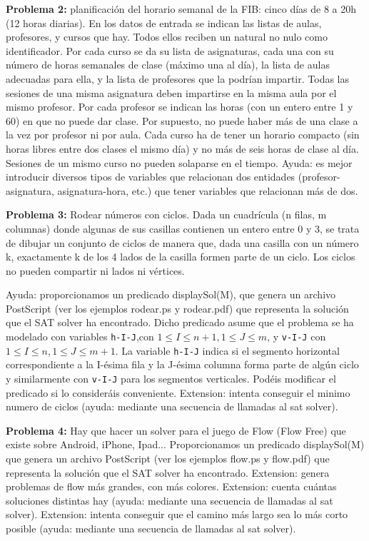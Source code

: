 \documentclass[11pt]{article}
\begin{document}
\textbf{Problema 2:} planificación del horario semanal de la FIB: cinco días de 8 a 20h (12 horas diarias).
En los datos de entrada se indican las listas de aulas, profesores, y cursos que hay. Todos ellos
reciben un natural no nulo como identificador. Por cada curso se da su lista de asignaturas, cada
una con su número de horas semanales de clase (máximo una al día), la lista de aulas adecuadas para
ella, y la lista de profesores que la podrían impartir. Todas las sesiones de una misma asignatura
deben impartirse en la misma aula por el mismo profesor. Por cada profesor se indican las horas
(con un entero entre 1 y 60) en que no puede dar clase. Por supuesto, no puede haber más de una
clase a la vez por profesor ni por aula. Cada curso ha de tener un horario compacto (sin horas
libres entre dos clases el mismo día) y no más de seis horas de clase al día. Sesiones de un mismo
curso no pueden solaparse en el tiempo. Ayuda: es mejor introducir diversos tipos de variables que relacionan
dos entidades (profesor-asignatura, asignatura-hora, etc.) que tener variables que relacionan más de dos.
\medskip

\textbf{Problema 3:} Rodear números con ciclos. Dada un cuadrícula (n filas, m columnas) donde algunas
de sus casillas contienen un entero entre 0 y 3, se trata de dibujar un conjunto de ciclos de manera
que, dada una casilla con un número k, exactamente k de los 4 lados de la casilla formen parte de
un ciclo. Los ciclos no pueden compartir ni lados ni vértices.

Ayuda: proporcionamos un predicado displaySol(M), que genera un archivo PostScript (ver los ejemplos rodear.ps y rodear.pdf) que
representa la solución que el SAT solver ha encontrado. Dicho predicado asume que el problema
se ha modelado con variables \texttt{h-I-J},con $1 \leq I \leq n + 1, 1 \leq J \leq m$, y \texttt{v-I-J} con $1 \leq I \leq n,
1 \leq J \leq m+1$. La variable \texttt{h-I-J} indica si el segmento horizontal correspondiente a la I-ésima fila
y la J-ésima columna forma parte de algún ciclo y similarmente con \texttt{v-I-J} para los segmentos
verticales. Podéis modificar el predicado si lo consideráis conveniente.
Extension: intenta conseguir el minimo numero de ciclos (ayuda: mediante una secuencia de llamadas al sat solver).
\medskip


\textbf{Problema 4:} Hay que hacer un solver para el juego de Flow (Flow Free) que existe sobre Android,
iPhone, Ipad... Proporcionamos un predicado displaySol(M) que genera un archivo PostScript (ver los ejemplos flow.ps y flow.pdf) que
representa la solución que el SAT solver ha encontrado. Extension: genera problemas de flow más grandes, con más colores.
Extension: cuenta cuántas soluciones distintas hay (ayuda: mediante una secuencia de llamadas al sat solver).
Extension: intenta conseguir que el camino más largo sea lo más corto posible (ayuda: mediante una secuencia de llamadas al sat solver).
\end{document}
